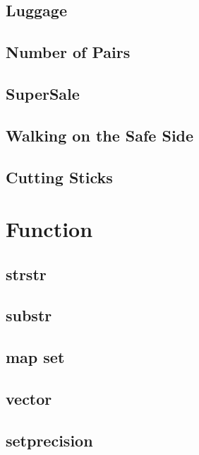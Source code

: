        \subsection{Luggage}
                
        \subsection{Number of Pairs}
                
        \subsection{SuperSale}
                
        \subsection{Walking on the Safe Side}
                
        \subsection{Cutting Sticks}
                

\section{Function}
        \subsection{strstr}
                
        \subsection{substr}
                
        \subsection{map set}
                
        \subsection{vector}
                
        \subsection{setprecision}
                
